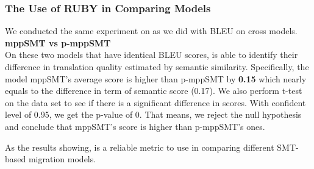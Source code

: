 \subsubsection{The Use of RUBY in Comparing Models}
We conducted the same experiment on {\model} as we did with BLEU on cross models. 
\textbf{mppSMT vs p-mppSMT}\\
On these two models that have identical BLEU scores, {\model} is able to identify their difference in translation quality estimated by semantic similarity. Specifically, the model mppSMT's average {\model} score is higher than p-mppSMT by \textbf{0.15} which nearly equals to the difference in term of semantic score (0.17). We also perform t-test on the data set to see if there is a significant difference in {\model} scores. With confident level of 0.95, we get the p-value of 0. That means, we reject the null hypothesis and conclude that mppSMT's {\model} score is higher than p-mppSMT's ones.

As the results showing, {\model} is a reliable metric to use in comparing different SMT-based migration models. 	